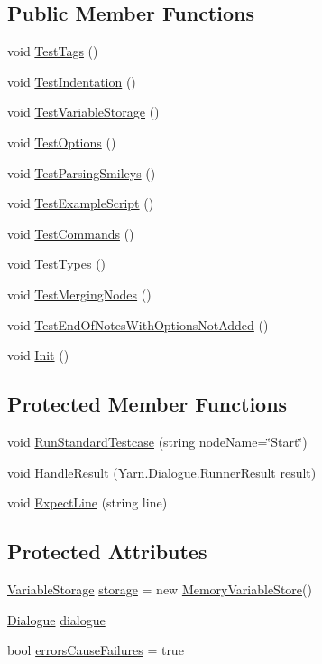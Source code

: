 \subsection*{Public Member Functions}
\begin{DoxyCompactItemize}
\item 
void \hyperlink{a00100_a08ea3ce23a86ac148b79ccafda629a26}{Test\-Tags} ()
\item 
void \hyperlink{a00100_a362c5ebd264980ebc9ba4df36b97c885}{Test\-Indentation} ()
\item 
void \hyperlink{a00100_aba85969007707d78dd3da94cdcabaa83}{Test\-Variable\-Storage} ()
\item 
void \hyperlink{a00100_ad81b7da69ab4b662eba838860402bb8d}{Test\-Options} ()
\item 
void \hyperlink{a00100_a0036732bb105c0776e8061a9f9ec58f6}{Test\-Parsing\-Smileys} ()
\item 
void \hyperlink{a00100_a1d044fd44e610a35ef09d486eb06ee37}{Test\-Example\-Script} ()
\item 
void \hyperlink{a00100_a444de0b9a3cad905065960001a5e19df}{Test\-Commands} ()
\item 
void \hyperlink{a00100_a6bf682420e6a34aa739a2442bb8896b2}{Test\-Types} ()
\item 
void \hyperlink{a00100_a4da987e2dbc65b35cc6bd07392f71453}{Test\-Merging\-Nodes} ()
\item 
void \hyperlink{a00100_a6cc57344745b5fb315abdeacdd23b659}{Test\-End\-Of\-Notes\-With\-Options\-Not\-Added} ()
\item 
void \hyperlink{a00146_a357a0dab579f9e45666c10779683dc27}{Init} ()
\end{DoxyCompactItemize}
\subsection*{Protected Member Functions}
\begin{DoxyCompactItemize}
\item 
void \hyperlink{a00146_abffa134d40d72b21e6b35c3bf05fc53f}{Run\-Standard\-Testcase} (string node\-Name=\char`\"{}Start\char`\"{})
\item 
void \hyperlink{a00146_a7b525f85a26d7c942e1cbfa5d6453893}{Handle\-Result} (\hyperlink{a00132}{Yarn.\-Dialogue.\-Runner\-Result} result)
\item 
void \hyperlink{a00146_ac21a5082ddac1da9db17ae54038df44e}{Expect\-Line} (string line)
\end{DoxyCompactItemize}
\subsection*{Protected Attributes}
\begin{DoxyCompactItemize}
\item 
\hyperlink{a00166}{Variable\-Storage} \hyperlink{a00146_a23d59ace1516ca72924c6fe3feafd3f7}{storage} = new \hyperlink{a00110}{Memory\-Variable\-Store}()
\item 
\hyperlink{a00072}{Dialogue} \hyperlink{a00146_a4cff5de56c4b8a91c76b6eb2d622a795}{dialogue}
\item 
bool \hyperlink{a00146_ac978fe85db843c51411f5517bdbe0eb8}{errors\-Cause\-Failures} = true
\end{DoxyCompactItemize}
